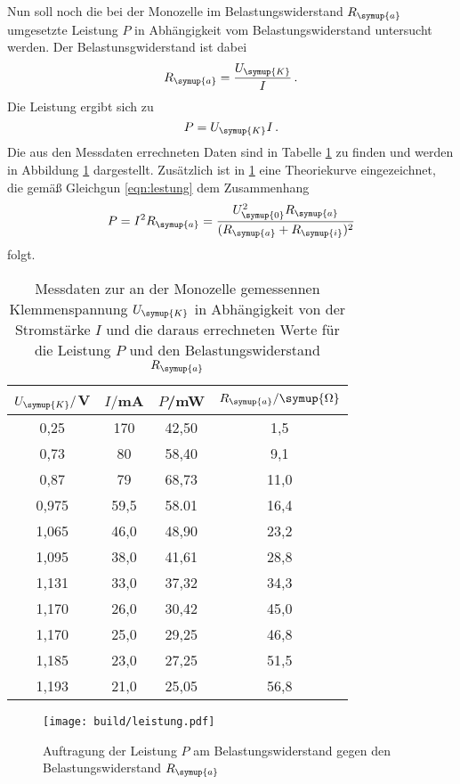 Nun soll noch die bei der Monozelle im Belastungswiderstand $R_{\symup{a}}$ umgesetzte
Leistung $P$ in Abhängigkeit vom Belastungswiderstand untersucht werden.
Der Belastunsgwiderstand ist dabei
\begin{equation}
  R_{\symup{a}}=\frac{U_{\symup{K}}}{I}\,.
\end{equation}
Die Leistung ergibt sich zu
\begin{equation}
  P=U_{\symup{K}}I\,.
\end{equation}
Die aus den Messdaten errechneten Daten sind in Tabelle \ref{tab:leistung} zu finden und
werden in Abbildung \ref{fig:leistung} dargestellt. Zusätzlich ist in \ref{fig:leistung} eine
Theoriekurve eingezeichnet, die gemäß Gleichgun \eqref{eqn:lestung} dem Zusammenhang
\begin{equation}
  P=I^2 R_{\symup{a}} = \frac{U_{\symup{0}}^2 R_{\symup{a}}}{(R_{\symup{a}}+R_{\symup{i}})^2}
\end{equation}
folgt.

\begin{table}
  \centering
  \caption{Messdaten zur an der Monozelle gemessennen Klemmenspannung $U_{\symup{K}}$
  in Abhängigkeit von der Stromstärke $I$ und die daraus errechneten Werte für
  die Leistung $P$ und den Belastungswiderstand $R_{\symup{a}}$}
  \label{tab:leistung}
  \begin{tabular}{c c c c}
    \toprule
    $U_{\symup{K}}/$V & $I/$mA & $P$/mW & $R_{\symup{a}}/\symup{\Omega}$\\
    \midrule
    0,25	&  170 &   42,50  &  1,5\\
    0,73	&  80  &   58,40  &  9,1\\
    0,87	&  79  &   68,73  &  11,0\\
    0,975	& 59,5 &   58.01  &  16,4\\
    1,065	& 46,0 &   48,90  &  23,2\\
    1,095	& 38,0 &   41,61  &  28,8\\
    1,131	& 33,0 &   37,32  &  34,3\\
    1,170	& 26,0 &   30,42  &  45,0\\
    1,170	& 25,0 &   29,25  &  46,8\\
    1,185	& 23,0 &   27,25  &  51,5\\
    1,193	& 21,0 &   25,05  &  56,8\\
    \bottomrule
  \end{tabular}
\end{table}

\begin{figure}
  \centering
  \texttt{[image: build/leistung.pdf]}
  \caption{Auftragung der Leistung $P$ am Belastungswiderstand gegen den Belastungswiderstand
  $R_{\symup{a}}$}
  \label{fig:leistung}
\end{figure}

